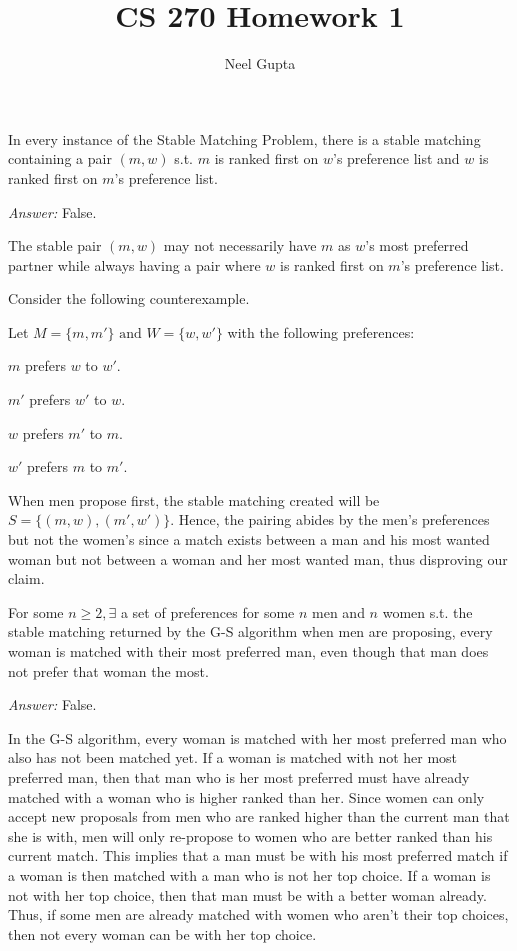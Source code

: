 \documentclass[12pt]{article}
\newenvironment{problem}[2][Problem]{\begin{trivlist}
\item[\hskip \labelsep {\bfseries #1}\hskip \labelsep {\bfseries #2.}]}{\end{trivlist}}
\begin{document}

\title{\vspace{-4.1cm}CS 270 Homework 1}
\author{Neel Gupta}
\maketitle

\begin{problem}{1}
In every instance of the Stable Matching Problem, there is a stable matching containing a pair $(m,w)$ s.t. $m$ is ranked first on $w$'s preference list and $w$ is ranked first on $m$'s preference list.
\end{problem}

\textit{Answer: } False.

The stable pair $(m,w)$ may not necessarily have $m$ as $w$'s most preferred partner while always having a pair where $w$ is ranked first on $m$'s preference list.

Consider the following counterexample.

Let $M = \{m, m'\} \text{ and } W = \{w, w'\}$ with the following preferences:

$m$ prefers $w$ to $w'$.

$m'$ prefers $w'$ to $w$.

$w$ prefers $m'$ to $m$.

$w'$ prefers $m$ to $m'$.

When men propose first, the stable matching created will be $S =\{(m,w),(m', w')\}$. Hence, the pairing abides by the men's preferences but not the women's since a match exists between a man and his most wanted woman but not between a woman and her most wanted man, thus disproving our claim. 

\begin{problem}{2}
For some $n\geq 2, \exists$ a set of preferences for some $n$ men and $n$ women s.t. the stable matching returned by the G-S algorithm when men are proposing, every woman is matched with their most preferred man, even though that man does not prefer that woman the most. 
\end{problem}

\textit{Answer: } False.

In the G-S algorithm, every woman is matched with her most preferred man who also has not been matched yet. If a woman is matched with not her most preferred man, then that man who is her most preferred must have already matched with a woman who is higher ranked than her. Since women can only accept new proposals from men who are ranked higher than the current man that she is with, men will only re-propose to women who are better ranked than his current match. This implies that a man must be with his most preferred match if a woman is then matched with a man who is not her top choice. If a woman is not with her top choice, then that man must be with a better woman already. Thus, if some men are already matched with women who aren't their top choices, then not every woman can be with her top choice. 
\end{document}
